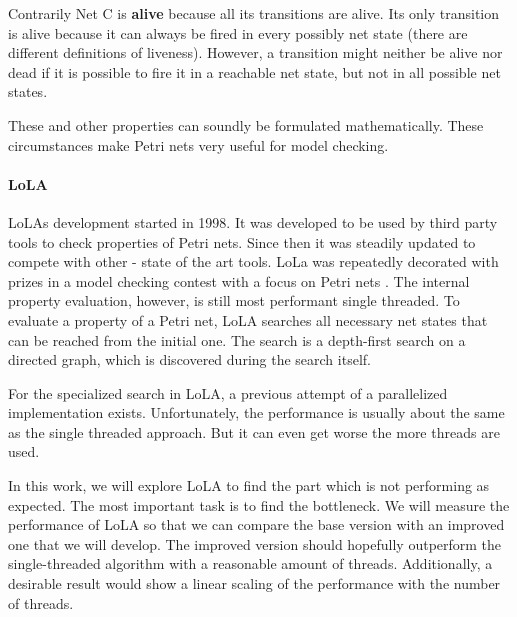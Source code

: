 Contrarily Net C is \textbf{alive} because all its transitions are alive. Its only transition is alive because it can always be fired in every possibly net state (there are different definitions of liveness\cite{murata1989petri}). However, a transition might neither be alive nor dead if it is possible to fire it in a reachable net state, but not in all possible net states.

These and other properties can soundly be formulated mathematically. These circumstances make Petri nets very useful for model checking.



\paragraph*{LoLA}
LoLAs development started in 1998. It was developed to be used by third party tools to check properties of Petri nets\cite{schmidt2000lola}. Since then it was steadily updated to compete with other - state of the art tools. LoLa was repeatedly decorated with  prizes in a model checking contest with a focus on Petri nets \cite{MCC2017}.
The internal property evaluation, however, is still most performant single threaded. To evaluate a property of a Petri net, LoLA searches all necessary net states that can be reached from the initial one. The search is a depth-first search on a directed graph, which is discovered during the search itself.

For the specialized search in LoLA, a previous attempt of a parallelized implementation exists. Unfortunately, the performance is usually about the same as the single threaded approach. But it can even get worse the more threads are used.

In this work, we will explore LoLA to find the part which is not performing as expected. The most important task is to find the bottleneck. We will measure the performance of LoLA so that we can compare the base version with an improved one that we will develop. The improved version should hopefully outperform the single-threaded algorithm with a reasonable amount of threads. Additionally, a desirable result would show a linear scaling of the performance with the number of threads.
